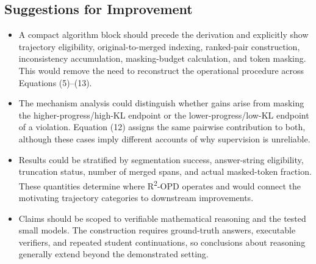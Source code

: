 \subsection*{Suggestions for Improvement}
\begin{itemize}
\item A compact algorithm block should precede the derivation and explicitly show trajectory eligibility, original-to-merged indexing, ranked-pair construction, inconsistency accumulation, masking-budget calculation, and token masking. This would remove the need to reconstruct the operational procedure across Equations (5)--(13).
\par{}
\begin{responsebox}[frametitle={Response to S1}]
\vspace*{2\baselineskip}
\end{responsebox}

\item The mechanism analysis could distinguish whether gains arise from masking the higher-progress/high-KL endpoint or the lower-progress/low-KL endpoint of a violation. Equation (12) assigns the same pairwise contribution to both, although these cases imply different accounts of why supervision is unreliable.
\par{}
\begin{responsebox}[frametitle={Response to S2}]
\vspace*{2\baselineskip}
\end{responsebox}

\item Results could be stratified by segmentation success, answer-string eligibility, truncation status, number of merged spans, and actual masked-token fraction. These quantities determine where R\textsuperscript{2}-OPD operates and would connect the motivating trajectory categories to downstream improvements.
\par{}
\begin{responsebox}[frametitle={Response to S3}]
\vspace*{2\baselineskip}
\end{responsebox}

\item Claims should be scoped to verifiable mathematical reasoning and the tested small models. The construction requires ground-truth answers, executable verifiers, and repeated student continuations, so conclusions about reasoning generally extend beyond the demonstrated setting.
\par{}
\begin{responsebox}[frametitle={Response to S4}]
\vspace*{2\baselineskip}
\end{responsebox}

\end{itemize}

